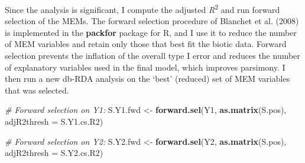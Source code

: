 \documentclass[10pt,A4,]{article}
\newenvironment{Shaded}{\begin{snugshade}}{\end{snugshade}}
\newcommand{\KeywordTok}[1]{\textcolor[rgb]{0.13,0.29,0.53}{\textbf{#1}}}
\newcommand{\DataTypeTok}[1]{\textcolor[rgb]{0.13,0.29,0.53}{#1}}
\newcommand{\StringTok}[1]{\textcolor[rgb]{0.31,0.60,0.02}{#1}}
\newcommand{\CommentTok}[1]{\textcolor[rgb]{0.56,0.35,0.01}{\textit{#1}}}
\newcommand{\NormalTok}[1]{#1}
\begin{document}
Since the analysis is significant, I compute the adjusted
\emph{R}\textsuperscript{2} and run forward selection of the MEMs. The
forward selection procedure of Blanchet et al. (2008) is implemented in
the \textbf{packfor} package for R, and I use it to reduce the number of
MEM variables and retain only those that best fit the biotic data.
Forward selection prevents the inflation of the overall type I error and
reduces the number of explanatory variables used in the final model,
which improves parsimony. I then run a new db-RDA analysis on the `best'
(reduced) set of MEM variables that was selected.

\begin{Shaded}
\begin{Highlighting}[]
\CommentTok{# Forward selection on Y1:}
\NormalTok{S.Y1.fwd <-}\StringTok{ }\KeywordTok{forward.sel}\NormalTok{(Y1, }\KeywordTok{as.matrix}\NormalTok{(S.pos), }\DataTypeTok{adjR2thresh =}\NormalTok{ S.Y1.cs.R2)}

\CommentTok{# Forward selection on Y2:}
\NormalTok{S.Y2.fwd <-}\StringTok{ }\KeywordTok{forward.sel}\NormalTok{(Y2, }\KeywordTok{as.matrix}\NormalTok{(S.pos), }\DataTypeTok{adjR2thresh =}\NormalTok{ S.Y2.cs.R2)}
\end{Highlighting}
\end{Shaded}
\end{document}
